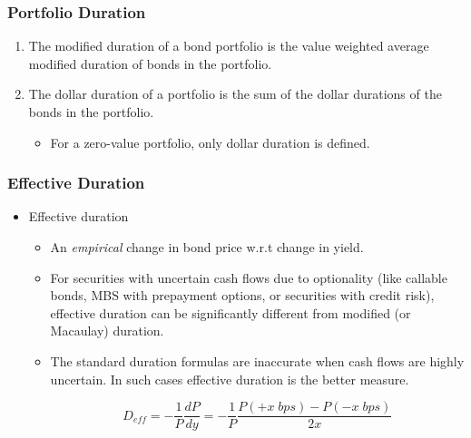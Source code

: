 \documentclass[10pt]{beamer}
\begin{document}
\begin{frame}
	\frametitle{Portfolio Duration}
	
	\begin{enumerate} \itemsep15pt
		\item The modified duration of a bond portfolio is the value weighted average modified duration of bonds in the
		portfolio.
		\item The dollar duration of a portfolio is the sum of the
		dollar durations of the bonds in the portfolio.
		
		\begin{itemize} \itemsep10pt \vspace{10pt}
			\item For a zero-value portfolio, only dollar duration is defined.
		\end{itemize}
	\end{enumerate}
	
\end{frame}




\begin{frame}
	\frametitle{Effective Duration}
	
	\begin{itemize} \itemsep15pt
		
		\item Effective duration
		
		\begin{itemize} \itemsep10pt \vspace{10pt}
			\item An \textit{empirical} change in bond price w.r.t change in yield.
			\item For securities with uncertain cash flows due to optionality (like callable bonds, MBS with prepayment options, or securities with credit risk),
			effective duration can be significantly different from modified (or Macaulay) duration.
			\item The standard duration formulas are inaccurate when cash flows are highly uncertain. In such cases effective duration is the better measure.
			
			$$
			D_{eff} = -\frac{1}{P}\frac{dP}{dy} =-\frac{1}{P}\frac{P(+x \; bps) - P(-x \; bps)}{2x}
			$$
		\end{itemize}
	\end{itemize}
	
\end{frame}
\end{document}

